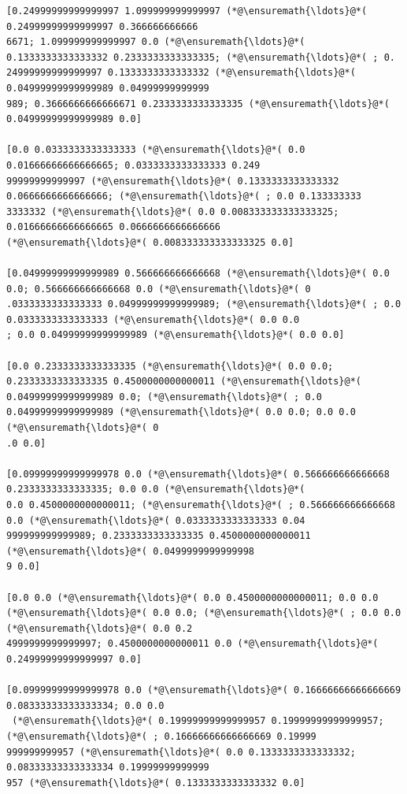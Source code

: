 \documentclass[12pt,a4paper]{article}
\begin{document}
\begin{lstlisting}
[0.24999999999999997 1.099999999999997 (*@\ensuremath{\ldots}@*( 0.24999999999999997 0.366666666666
6671; 1.099999999999997 0.0 (*@\ensuremath{\ldots}@*( 0.1333333333333332 0.2333333333333335; (*@\ensuremath{\ldots}@*( ; 0.
24999999999999997 0.1333333333333332 (*@\ensuremath{\ldots}@*( 0.04999999999999989 0.04999999999999
989; 0.3666666666666671 0.2333333333333335 (*@\ensuremath{\ldots}@*( 0.04999999999999989 0.0]

[0.0 0.0333333333333333 (*@\ensuremath{\ldots}@*( 0.0 0.01666666666666665; 0.0333333333333333 0.249
99999999999997 (*@\ensuremath{\ldots}@*( 0.1333333333333332 0.0666666666666666; (*@\ensuremath{\ldots}@*( ; 0.0 0.133333333
3333332 (*@\ensuremath{\ldots}@*( 0.0 0.008333333333333325; 0.01666666666666665 0.0666666666666666 
(*@\ensuremath{\ldots}@*( 0.008333333333333325 0.0]

[0.04999999999999989 0.566666666666668 (*@\ensuremath{\ldots}@*( 0.0 0.0; 0.566666666666668 0.0 (*@\ensuremath{\ldots}@*( 0
.0333333333333333 0.04999999999999989; (*@\ensuremath{\ldots}@*( ; 0.0 0.0333333333333333 (*@\ensuremath{\ldots}@*( 0.0 0.0
; 0.0 0.04999999999999989 (*@\ensuremath{\ldots}@*( 0.0 0.0]

[0.0 0.2333333333333335 (*@\ensuremath{\ldots}@*( 0.0 0.0; 0.2333333333333335 0.4500000000000011 (*@\ensuremath{\ldots}@*( 
0.04999999999999989 0.0; (*@\ensuremath{\ldots}@*( ; 0.0 0.04999999999999989 (*@\ensuremath{\ldots}@*( 0.0 0.0; 0.0 0.0 (*@\ensuremath{\ldots}@*( 0
.0 0.0]

[0.09999999999999978 0.0 (*@\ensuremath{\ldots}@*( 0.566666666666668 0.2333333333333335; 0.0 0.0 (*@\ensuremath{\ldots}@*( 
0.0 0.4500000000000011; (*@\ensuremath{\ldots}@*( ; 0.566666666666668 0.0 (*@\ensuremath{\ldots}@*( 0.0333333333333333 0.04
999999999999989; 0.2333333333333335 0.4500000000000011 (*@\ensuremath{\ldots}@*( 0.0499999999999998
9 0.0]

[0.0 0.0 (*@\ensuremath{\ldots}@*( 0.0 0.4500000000000011; 0.0 0.0 (*@\ensuremath{\ldots}@*( 0.0 0.0; (*@\ensuremath{\ldots}@*( ; 0.0 0.0 (*@\ensuremath{\ldots}@*( 0.0 0.2
4999999999999997; 0.4500000000000011 0.0 (*@\ensuremath{\ldots}@*( 0.24999999999999997 0.0]

[0.09999999999999978 0.0 (*@\ensuremath{\ldots}@*( 0.16666666666666669 0.08333333333333334; 0.0 0.0
 (*@\ensuremath{\ldots}@*( 0.19999999999999957 0.19999999999999957; (*@\ensuremath{\ldots}@*( ; 0.16666666666666669 0.19999
999999999957 (*@\ensuremath{\ldots}@*( 0.0 0.1333333333333332; 0.08333333333333334 0.19999999999999
957 (*@\ensuremath{\ldots}@*( 0.1333333333333332 0.0]


\end{lstlisting}
\end{document}
